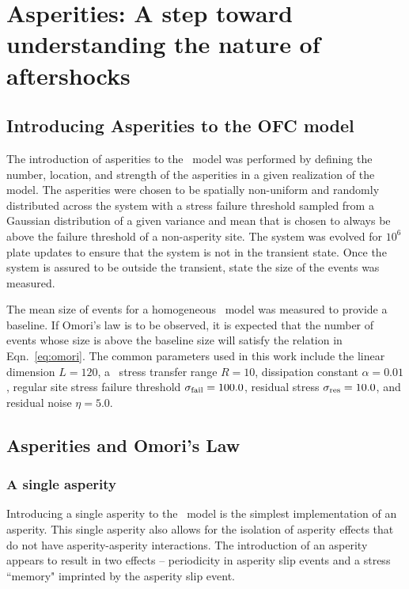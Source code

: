 
\chapter{\label{chp:asper}Asperities: A step toward understanding the nature of aftershocks}

\section{Introducing Asperities to the OFC model}

The introduction of asperities to the \ofc\ model was performed by defining the number, location, and strength of the asperities in a given realization of the model. The asperities  were chosen to be spatially non-uniform and randomly distributed across the system with a stress failure threshold sampled from a Gaussian distribution of a given variance and  mean that is chosen to always be above the failure threshold of a  non-asperity site. The system was evolved for $10^6$ plate updates to ensure that the system is not  in the transient state. Once the system is assured to be outside the transient, state the size of the events was measured. 

The mean size of events for a homogeneous \ofc\ model was measured to provide a baseline. If Omori's law is to be observed, it is expected that the number of events whose size is above the baseline size will satisfy the relation  in Eqn.~\eqref{eq:omori}. The common parameters used in this work include the linear dimension  $L=120$, a \lr\ stress transfer range $R=10$, dissipation constant $\alpha=0.01$, regular site stress failure threshold $\sigma_{\rm fail}=100.0$, residual stress $\sigma_{\rm res}=10.0$, and residual noise $\eta=5.0$.


\section{Asperities and Omori's Law}
\subsection{ A single asperity }

Introducing a single asperity to the \ofc\ model is the simplest implementation of an asperity. This single asperity also allows for the isolation of asperity effects that do not have asperity-asperity interactions. The introduction of an asperity appears to result in two effects -- periodicity in asperity slip events and a stress ``memory" imprinted by the asperity slip event. 

